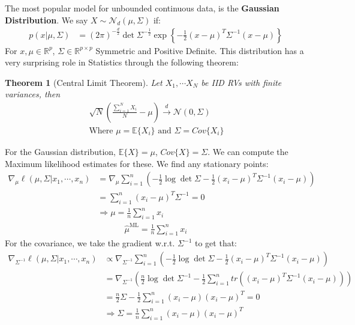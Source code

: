 \documentclass[]{article}
\theoremstyle{mattstyle}
\newtheorem{theorem}{Theorem}[section]
\theoremstyle{definition}
\begin{document}
The most popular model for unbounded continuous data, is the \textbf{Gaussian Distribution}. We say \(X \sim \mathcal{N}_d(\mu, \Sigma)\) if:
\begin{align}\label{eq:gaussian}
p(x|\mu, \Sigma)&={(2\pi)}^{-\frac{d}{2}}\det \Sigma^{-\frac{1}{2}}\exp{ \left\{-\frac{1}{2}(x-\mu)^T\Sigma^{-1}(x-\mu) \right\} }
\end{align}
For \(x, \mu\in\mathbb{R}^p\), \(\Sigma \in \mathbb{R}^{p \times p}\) Symmetric and Positive Definite. This distribution has a very surprising role in Statistics through the following theorem:
\begin{theorem}[Central Limit Theorem]
	Let $X_1, \cdots X_N$ be IID RVs with finite variances, then 
	\begin{align*}
	&\sqrt{N}\left(\frac{\sum_{i=1}^N X_i}{N} - \mu\right) \overset{d}{\rightarrow} \mathcal{N}(0, \Sigma)\\
	&\text{Where $\mu = \mathbb{E}\{X_i\}$ and $\Sigma = Cov\{X_i\}$ }
	\end{align*}
\end{theorem}
For the Gaussian distribution, $\mathbb{E}\{X\}=\mu$, $Cov\{X\}=\Sigma$. We can compute the Maximum likelihood estimates for these. We find any stationary points:
\begin{align*}
\nabla_{\mu} \ell(\mu,\Sigma|x_1,\cdots, x_n) &= \nabla_{\mu} \sum_{i=1}^n\left(-\frac{1}{2}\log\det \Sigma -\frac{1}{2}(x_i-\mu)^T\Sigma^{-1}(x_i-\mu)\right)\\
&= \sum_{i=1}^n (x_i-\mu)^T\Sigma^{-1}=0\\
&\Rightarrow  \mu = \frac{1}{n}\sum_{i=1}^n x_i
\end{align*}
\begin{align*}
\boxed{\hat{\mu}^{\text{ML}} = \frac{1}{n}\sum_{i=1}^n x_i}
\end{align*}
For the covariance, we take the gradient w.r.t. $\Sigma^{-1}$ to get that:
\begin{align*}
\nabla_{\Sigma^{-1}} \ell(\mu,\Sigma|x_1,\cdots, x_n) &\propto\nabla_{\Sigma^{-1}} \sum_{i=1}^n\left(-\frac{1}{2}\log\det \Sigma -\frac{1}{2}(x_i-\mu)^T\Sigma^{-1}(x_i-\mu)\right)\\
&=\nabla_{\Sigma^{-1}} \left(\frac{n}{2}\log\det \Sigma^{-1} -\frac{1}{2}\sum_{i=1}^n tr((x_i-\mu)^T\Sigma^{-1}(x_i-\mu))\right)\\
&=\frac{n}{2}\Sigma -\frac{1}{2}\sum_{i=1}^n (x_i-\mu)(x_i-\mu)^T=0\\
&\Rightarrow \Sigma = \frac{1}{n}\sum_{i=1}^n(x_i-\mu)(x_i-\mu)^T
\end{align*}
\end{document}
